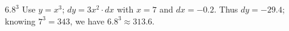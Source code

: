 {$6.8^3$
}
{Use $y = x^3$; $dy = 3x^2\cdot dx$ with $x=7$ and $dx = -0.2$. Thus $dy = -29.4$; knowing $7^3=343$, we have $6.8^3 \approx 313.6$.
}

